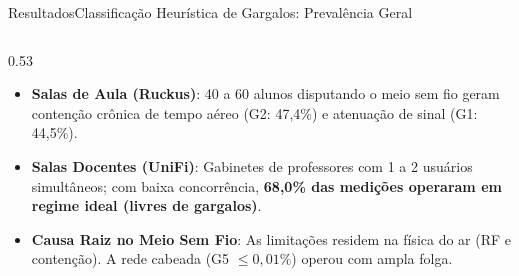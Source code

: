 \documentclass[10pt,brazil]{beamer}
\begin{document}
    \begin{frame}[label=slide_gargalos_geral]{Resultados}{Classificação Heurística de Gargalos: Prevalência Geral}
        \begin{columns}
            \begin{column}{0.53\textwidth}
                \footnotesize
                \begin{table}[h]
                    \centering
                \end{table}
                \vspace{-0.2cm}
                \begin{itemize}
                    \setlength{\itemsep}{2pt}
                    \item \textbf{Salas de Aula (Ruckus)}: 40 a 60 alunos disputando o meio sem fio geram contenção crônica de tempo aéreo (G2: 47,4\%) e atenuação de sinal (G1: 44,5\%).
                    \item \textbf{Salas Docentes (UniFi)}: Gabinetes de professores com 1 a 2 usuários simultâneos; com baixa concorrência, \textbf{68,0\% das medições operaram em regime ideal (livres de gargalos)}.
                    \item \textbf{Causa Raiz no Meio Sem Fio}: As limitações residem na física do ar (RF e contenção). A rede cabeada (G5 $\le 0,01\%$) operou com ampla folga.

\end{itemize}
\end{column}
\end{columns}
\end{frame}
\end{document}
